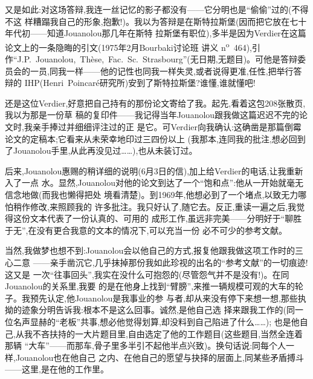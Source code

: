 \pmark 又是如此:对这场答辩,我连一丝记忆的影子都没有——它分明也是“偷偷”过的(不得不这
样糟蹋我自己的形象,抱歉!)。我以为答辩是在斯特拉斯堡(因而把它放在七十年代初——知道Jouanolou那几年在斯特
拉斯堡有职位),多半是因为Verdier在这篇论文上的一条隐晦的引文(1975年2月Bourbaki讨论班
讲义 n\textsuperscript{o}~464),引作“J.P.~Jouanolou,~Thèse,~Fac.~Sc.~Strasbourg”(无日期,无题目)。可他是答辩委
员会的一员,同我一样——他的记性也同我一样失灵,或者说得更准,任性,把举行答辩的 IHP\dmark{}(Henri~Poincaré研究所)安到了斯特拉斯堡?谁懂,谁就懂吧!

还是这位Verdier,好意把自己持有的那份论文寄给了我。起先,看着这包208张散页,我以为那是一份草
稿的复印件——我记得当年Jouanolou跟我做这篇迟迟不完的论文时,我亲手捧过并细细评注过的正
是它。可Verdier向我确认:这确凿是那篇倒霉论文的定稿本;它看来从未荣幸地印过三四份以上
(我那本,连同我的批注,想必回到了Jouanolou手里,从此再没见过……),也从未装订过。

后来,Jouanolou惠赐的稍详细的说明(6月3日的信),加上给Verdier的电话,让我重新入了一点
水。显然,Jouanolou对他的论文到达了一个“饱和点”:他从一开始就毫无信念地做(而我也懒得把处
境看清楚)。到1969年,他想必到了一个堵点,以致无力哪怕稍作修改,来照顾我的
许多批注。我只好认了,随它去。反正,重读一遍之后,我觉得这份文本代表了一份认真的、可用的
成形工作,虽远非完美——分明好于“聊胜于无”,在没有更合我意的文本的情况下,可以充当一份
必不可少的参考文献。

\pmark 当然,我做梦也想不到:Jouanolou会以他自己的方式,报复他跟我做这项工作时的三心二意
\dmark{}——亲手凿沉它,几乎抹掉那份我如此珍视的出名的“参考文献”的一切痕迹!这又是
一次“往事回头”,我实在没什么可抱怨的(尽管怨气并不是没有!)。在同Jouanolou的关系里,我要
的是在他身上找到“臂膀”,来推一辆规模可观的大车的轮子。我预先认定,他Jouanolou是我事业的参
与者,却从来没有停下来想一想,那些执拗的迹象分明告诉我:根本不是这么回事。诚然,是他自己选
择来跟我工作的(同一位名声显赫的“老板”共事,想必他觉得划算,却没料到自己陷进了什么……);
也是他自己,从我不吝扶持的一大片题目里,自由选定了他的工作题目(这些题目,当然全连着那辆
“大车”——而那车,骨子里多半引不起他半点兴致)。换句话说:同每个人一样,Jouanolou也在他自己
之内、在他自己的愿望与抉择的层面上,同某些矛盾搏斗——这里,是在他的工作里。

